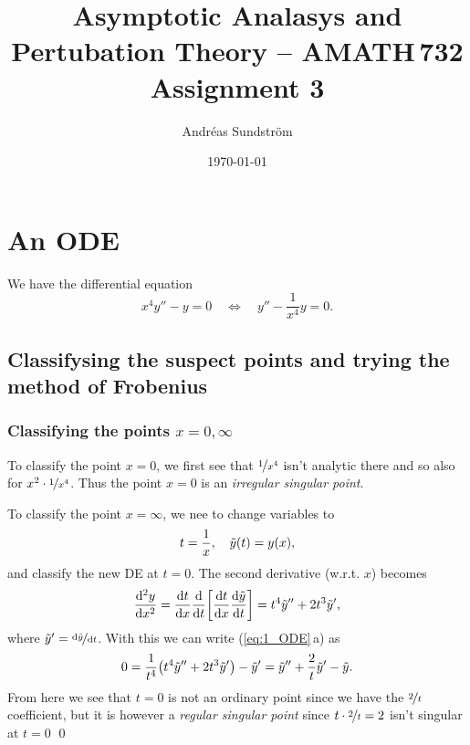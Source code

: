 \documentclass[11pt,letter, swedish, english
]{article}
\begin{document}
\title{Asymptotic Analasys and Pertubation Theory -- AMATH\,732 \\
Assignment 3}
\author{Andréas Sundström}
\date{\today}

\maketitle



\section{An ODE}
We have the differential equation
\begin{equation}\label{eq:1_ODE}
x^4y''-y=0
\quad\Longleftrightarrow\quad
y''-\frac{1}{x^4}y = 0.
\end{equation}

\subsection{Classifysing the suspect points 
  and trying the method of Frobenius} 

\subsubsection{Classifying the points $x=0, \infty$}
To classify the point $x=0$, we first see that $\nicefrac{1}{x^4}$
isn't analytic there and so also for $x^2\cdot\nicefrac{1}{x^4}$. Thus the
point $x=0$ is an \emph{irregular singular point}.

To classify the point $x=\infty$, we nee to change variables to
\begin{equation}\label{eq:t_x}
t=\frac{1}{x}\qcomma \tilde{y}(t)=y(x),
\end{equation}
and classify the new DE at $t=0$.
The second derivative (w.r.t. $x$) becomes
\begin{equation}
\dv[2]{y}{x}=\dv{t}{x}
\dv{t}\qty[\dv{t}{x}\dv{\tilde{y}}{t}]=t^4\tilde{y}''+2t^3\tilde{y}',
\end{equation}
where $\tilde{y}'=\nicefrac{\mathrm{d}\tilde{y}}{\mathrm{d}{t}}$. With this we can
write (\ref{eq:1_ODE}\,a) as
\begin{equation}\label{eq:1_new_ODE}
0=\frac{1}{t^4}\qty(t^4\tilde{y}''+2t^3\tilde{y}') - \tilde{y} '
= \tilde{y}'' +\frac{2}{t}\tilde{y}' - \tilde{y}.
\end{equation}
From here we see that $t=0$ is not an ordinary point since we have the
$\nicefrac{2}{t}$ coefficient, but it is however a \emph{regular singular
point} since $t\cdot\nicefrac{2}{t}=2$ isn't singular at $t=0$
\qed
\end{document}
